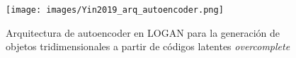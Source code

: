 \documentclass[spanish]{article}
\begin{document}
\begin{figure}[h]
\texttt{[image: images/Yin2019\_arq\_autoencoder.png]}
\centering
\caption{Arquitectura de autoencoder en LOGAN \cite{Yin2019} para la generación de objetos tridimensionales a partir de códigos latentes \textit{overcomplete}}
\label{LOGAN_arq_ae}
\end{figure}



\end{document}
